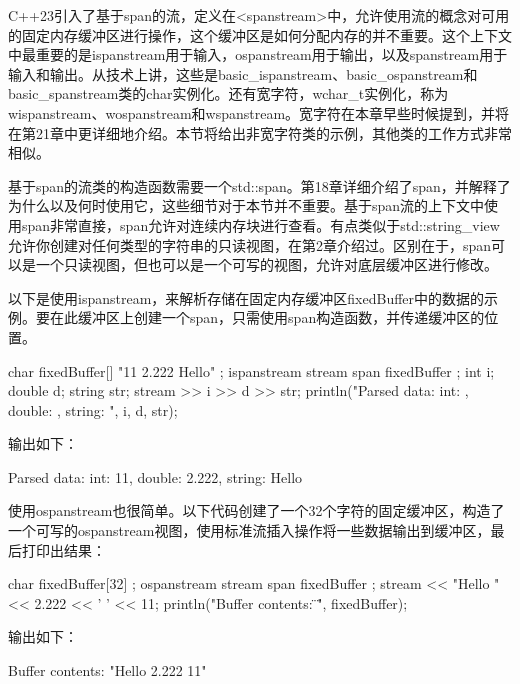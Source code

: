 

C++23引入了基于span的流，定义在<spanstream>中，允许使用流的概念对可用的固定内存缓冲区进行操作，这个缓冲区是如何分配内存的并不重要。这个上下文中最重要的是ispanstream用于输入，ospanstream用于输出，以及spanstream用于输入和输出。从技术上讲，这些是basic\_ispanstream、basic\_ospanstream和basic\_spanstream类的char实例化。还有宽字符，wchar\_t实例化，称为wispanstream、wospanstream和wspanstream。宽字符在本章早些时候提到，并将在第21章中更详细地介绍。本节将给出非宽字符类的示例，其他类的工作方式非常相似。

基于span的流类的构造函数需要一个std::span。第18章详细介绍了span，并解释了为什么以及何时使用它，这些细节对于本节并不重要。基于span流的上下文中使用span非常直接，span允许对连续内存块进行查看。有点类似于std::string\_view允许你创建对任何类型的字符串的只读视图，在第2章介绍过。区别在于，span可以是一个只读视图，但也可以是一个可写的视图，允许对底层缓冲区进行修改。

以下是使用ispanstream，来解析存储在固定内存缓冲区fixedBuffer中的数据的示例。要在此缓冲区上创建一个span，只需使用span构造函数，并传递缓冲区的位置。

\begin{cpp}
char fixedBuffer[] { "11 2.222 Hello" };
ispanstream stream { span { fixedBuffer } };
int i; double d; string str;
stream >> i >> d >> str;
println("Parsed data: int: {}, double: {}, string: {}", i, d, str);
\end{cpp}

输出如下：

\begin{shell}
Parsed data: int: 11, double: 2.222, string: Hello
\end{shell}

使用ospanstream也很简单。以下代码创建了一个32个字符的固定缓冲区，构造了一个可写的ospanstream视图，使用标准流插入操作将一些数据输出到缓冲区，最后打印出结果：

\begin{cpp}
char fixedBuffer[32] {};
ospanstream stream { span { fixedBuffer } };
stream << "Hello " << 2.222 << ' ' << 11;
println("Buffer contents: \"{}\"", fixedBuffer);
\end{cpp}

输出如下：

\begin{shell}
Buffer contents: "Hello 2.222 11"
\end{shell}






